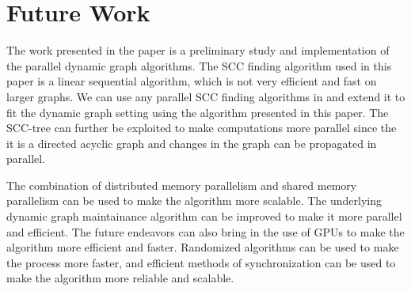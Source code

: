 \section{Future Work}\label{Sec: Future Work}
The work presented in the paper is a preliminary study and implementation of the parallel dynamic graph algorithms.
The SCC finding algorithm used in this paper is a linear sequential algorithm, which is not very efficient and fast on larger graphs.
We can use any parallel SCC finding algorithms in \cite{implementation} and extend it to fit the dynamic graph setting using the algorithm presented in this paper.
The SCC-tree can further be exploited to make computations more parallel since the it is a directed acyclic graph and changes in the graph can be propagated in parallel.

The combination of distributed memory parallelism and shared memory parallelism can be used to make the algorithm more scalable. 
The underlying dynamic graph maintainance algorithm can be improved to make it more parallel and efficient. 
The future endeavors can also bring in the use of GPUs to make the algorithm more efficient and faster. 
Randomized algorithms can be used to make the process more faster, and efficient methods of synchronization can be used to make the algorithm more reliable and scalable.